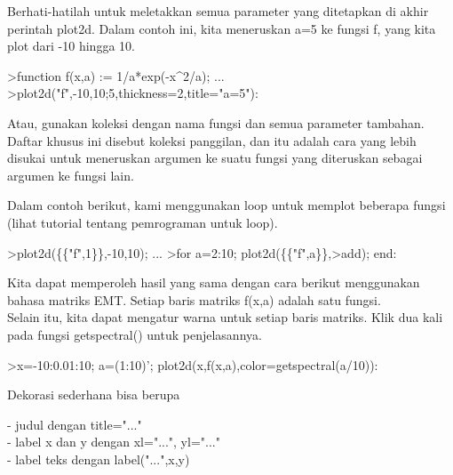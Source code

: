 \documentclass[a4paper,10pt]{article}
\begin{document}
\begin{eulernotebook}
\begin{eulercomment}
\begin{eulercomment}
\begin{eulercomment}
\begin{eulercomment}
\begin{eulercomment}
\begin{eulercomment}
\begin{eulercomment}
\begin{eulercomment}
\begin{eulercomment}
\begin{eulercomment}
\begin{eulercomment}
Berhati-hatilah untuk meletakkan semua parameter yang ditetapkan di
akhir perintah plot2d. Dalam contoh ini, kita meneruskan  a=5 ke
fungsi f, yang kita plot dari -10 hingga 10.
\end{eulercomment}
\begin{eulerprompt}
>function f(x,a) := 1/a*exp(-x^2/a); ...
>plot2d("f",-10,10;5,thickness=2,title="a=5"):
\end{eulerprompt}
\begin{eulercomment}
Atau, gunakan koleksi dengan nama fungsi dan semua parameter tambahan.
Daftar khusus ini disebut koleksi panggilan, dan itu  adalah cara yang
lebih disukai untuk meneruskan argumen ke suatu fungsi yang diteruskan
sebagai argumen ke fungsi lain.

Dalam contoh berikut, kami menggunakan loop untuk memplot beberapa
fungsi (lihat tutorial tentang pemrograman untuk loop).
\end{eulercomment}
\begin{eulerprompt}
>plot2d(\{\{"f",1\}\},-10,10); ...
>for a=2:10; plot2d(\{\{"f",a\}\},>add); end:
\end{eulerprompt}
\begin{eulercomment}
Kita dapat memperoleh hasil yang sama dengan cara berikut menggunakan
bahasa matriks EMT. Setiap baris matriks f(x,a) adalah satu fungsi.\\
Selain itu, kita dapat mengatur warna untuk setiap baris matriks. Klik
dua kali pada fungsi getspectral() untuk penjelasannya.
\end{eulercomment}
\begin{eulerprompt}
>x=-10:0.01:10; a=(1:10)'; plot2d(x,f(x,a),color=getspectral(a/10)):
\end{eulerprompt}
\begin{eulercomment}
Dekorasi sederhana bisa berupa

- judul dengan title="..."\\
- label x dan y dengan xl="...", yl="..."\\
- label teks dengan label("...",x,y)


\end{eulercomment}
\end{eulercomment}
\end{eulercomment}
\end{eulercomment}
\end{eulercomment}
\end{eulercomment}
\end{eulercomment}
\end{eulercomment}
\end{eulercomment}
\end{eulercomment}
\end{eulercomment}
\end{eulernotebook}
\end{document}
